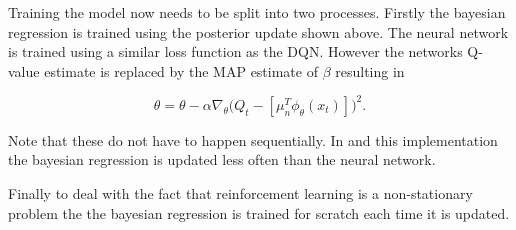 Training the model now needs to be split into two processes. Firstly the bayesian regression is trained using the posterior update shown above. The neural network is trained using a similar loss function as the DQN. However the networks Q-value estimate is replaced by the MAP estimate of $\beta$ resulting in

\begin{equation*}
	\theta = \theta - \alpha\nabla_\theta\big(Q_t - [\mu_n^T\phi_\theta(x_t)]\big)^2.
\end{equation*}

Note that these do not have to happen sequentially. In \cite{azziz_2018} and this implementation the bayesian regression is updated less often than the neural network.

Finally to deal with the fact that reinforcement learning is a non-stationary problem the the bayesian regression is trained for scratch each time it is updated.

\cleardoublepage